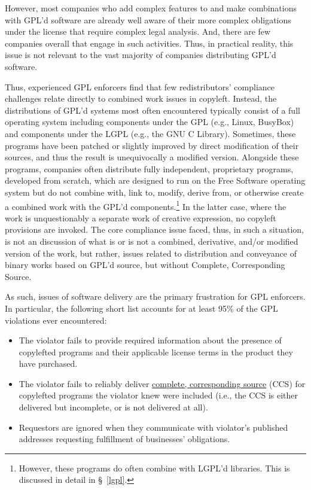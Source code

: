 However, most companies who add
complex features to and make combinations with GPL'd software
are already well aware of their
more complex obligations under the license that require complex legal
analysis.  And, there are few companies overall that engage in such
activities. Thus,  in practical reality, this issue is not relevant to the vast
majority of companies distributing GPL'd software.

Thus, experienced  GPL enforcers find that few redistributors'
compliance challenges relate directly to combined work issues in copyleft.
Instead, the distributions of GPL'd
systems most often encountered typically consist of a full operating system
including components under the GPL (e.g., Linux, BusyBox) and components
under the LGPL (e.g., the GNU C Library).  Sometimes, these programs have
been patched or slightly improved by direct modification of their sources,
and thus the result is unequivocally a modified version.  Alongside these programs,
companies often distribute fully independent, proprietary programs,
developed from scratch, which are designed to run on the Free Software operating
system but do not combine with, link to, modify, derive from, or otherwise
create a combined work with
the GPL'd components.\footnote{However, these programs do often combine
  with LGPL'd libraries. This is discussed in detail in \S~\ref{lgpl}.}
In the latter case, where the work is unquestionably a separate work of
creative expression, no copyleft provisions are invoked.
The core compliance issue faced, thus, in such a situation, is not an discussion of what is or is not a
combined, derivative, and/or modified version of the work, but rather, issues related to distribution and
conveyance of binary works based on GPL'd source, but without Complete,
Corresponding Source.

As such, issues of software delivery are the primary frustration for GPL
enforcers. In particular, the following short list accounts for at least 95\%
of the GPL violations ever encountered:

\begin{itemize}

\item The violator fails to provide required information about the presence
  of copylefted programs and their applicable license terms in the product
  they have purchased.

\item The violator fails to reliably deliver \hyperref[CCS
  Definition]{complete, corresponding source} (CCS) for copylefted programs
  the violator knew were included (i.e., the CCS is either delivered but
  incomplete, or is not delivered at all).

\item Requestors are ignored when they communicate with violator's published
  addresses requesting fulfillment of businesses’ obligations.
\end{itemize}

